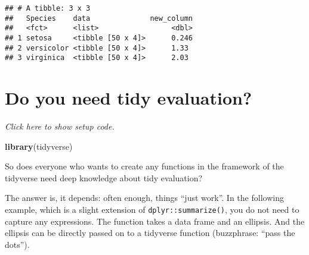 \documentclass[]{book}
\newenvironment{Shaded}{\begin{snugshade}}{\end{snugshade}}
\newcommand{\ControlFlowTok}[1]{\textcolor[rgb]{0.13,0.29,0.53}{\textbf{#1}}}
\newcommand{\DataTypeTok}[1]{\textcolor[rgb]{0.13,0.29,0.53}{#1}}
\newcommand{\KeywordTok}[1]{\textcolor[rgb]{0.13,0.29,0.53}{\textbf{#1}}}
\newcommand{\NormalTok}[1]{#1}
\newcommand{\OperatorTok}[1]{\textcolor[rgb]{0.81,0.36,0.00}{\textbf{#1}}}
\newcommand{\StringTok}[1]{\textcolor[rgb]{0.31,0.60,0.02}{#1}}
\begin{document}
\begin{Shaded}
\end{Shaded}

\begin{verbatim}
## # A tibble: 3 x 3
##   Species    data              new_column
##   <fct>      <list>                 <dbl>
## 1 setosa     <tibble [50 x 4]>      0.246
## 2 versicolor <tibble [50 x 4]>      1.33 
## 3 virginica  <tibble [50 x 4]>      2.03
\end{verbatim}

\hypertarget{do-you-need-tidy-evaluation}{%
\section{Do you need tidy evaluation?}\label{do-you-need-tidy-evaluation}}

\emph{Click here to show setup code.}

\begin{Shaded}
\begin{Highlighting}[]
\KeywordTok{library}\NormalTok{(tidyverse)}
\end{Highlighting}
\end{Shaded}

So does everyone who wants to create any functions in the framework of the tidyverse need deep knowledge about tidy evaluation?

The answer is, it depends: often enough, things ``just work''.
In the following example, which is a slight extension of \texttt{dplyr::summarize()}, you do not need to capture any expressions.
The function takes a data frame and an ellipsis.
And the ellipsis can be directly passed on to a tidyverse function (buzzphrase: ``pass the dots'').
\end{document}
